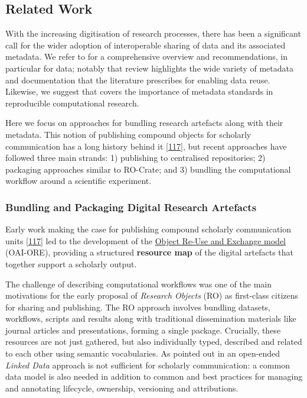 {\hypertarget{relatedwork}{%
\subsection{Related Work}\label{relatedwork}}

With the increasing digitisation of research processes, there has been a
significant call for the wider adoption of interoperable sharing of data
and its associated metadata. We refer to
\cite{ch5-72} for a
comprehensive overview and recommendations, in particular for data;
notably that review highlights the wide variety of metadata and
documentation that the literature prescribes for enabling data reuse.
Likewise, we suggest
\cite{Leipzig 2021} that
covers the importance of metadata standards in reproducible
computational research.

Here we focus on approaches for bundling research artefacts along with
their metadata. This notion of publishing compound objects for scholarly
communication has a long history behind it
\cite{Claerbout 1992}
\href{http://icl.utk.edu/ctwatch/quarterly/articles/2007/08/interoperability-for-the-discovery-use-and-re-use-of-units-of-scholarly-communication/}{{[}117{]}},
but recent approaches have followed three main strands: 1) publishing to
centralised repositories; 2) packaging approaches similar to RO-Crate;
and 3) bundling the computational workflow around a scientific
experiment.

\hypertarget{bundling-and-packaging-digital-research-artefacts}{%
\subsubsection{Bundling and Packaging Digital Research
Artefacts}\label{bundling-and-packaging-digital-research-artefacts}}

Early work making the case for publishing compound scholarly
communication units
\href{http://icl.utk.edu/ctwatch/quarterly/articles/2007/08/interoperability-for-the-discovery-use-and-re-use-of-units-of-scholarly-communication/}{{[}117{]}}
led to the development of the
\href{http://www.openarchives.org/ore/1.0/primer}{Object Re-Use and
Exchange model} (OAI-ORE), providing a structured \textbf{resource map}
of the digital artefacts that together support a scholarly output.

The challenge of describing computational workflows was one of the main
motivations for the early proposal of \emph{Research Objects} (RO)
\cite{Bechhofer 2013}
as first-class citizens for sharing and publishing. The RO approach
involves bundling datasets, workflows, scripts and results along with
traditional dissemination materials like journal articles and
presentations, forming a single package. Crucially, these resources are
not just gathered, but also individually typed, described and related to
each other using semantic vocabularies. As pointed out in
\cite{Bechhofer 2013} an
open-ended \emph{Linked Data} approach is not sufficient for scholarly
communication: a common data model is also needed in addition to common
and best practices for managing and annotating lifecycle, ownership,
versioning and attributions.

}
